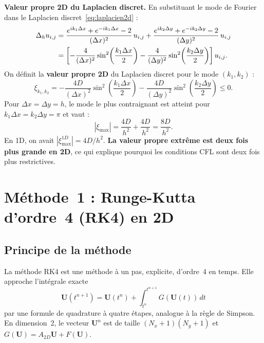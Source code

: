 \documentclass[11pt,a4paper]{report}
\begin{document}
\textbf{Valeur propre 2D du Laplacien discret.}
En substituant le mode de Fourier dans le Laplacien discret~\eqref{eq:laplacien2d} :
\begin{align}
  \Delta_h u_{i,j} &= \frac{e^{ik_1\Delta x}+e^{-ik_1\Delta x}-2}{(\Delta x)^2}\,u_{i,j}
                   + \frac{e^{ik_2\Delta y}+e^{-ik_2\Delta y}-2}{(\Delta y)^2}\,u_{i,j} \notag\\
  &= \left[-\frac{4}{(\Delta x)^2}\sin^2\!\left(\frac{k_1\Delta x}{2}\right)
           -\frac{4}{(\Delta y)^2}\sin^2\!\left(\frac{k_2\Delta y}{2}\right)\right]u_{i,j}.
\end{align}
On d\'efinit la \textbf{valeur propre 2D} du Laplacien discret pour le mode $(k_1,k_2)$ :
\begin{equation}\label{eq:eigenvalue2d}
  \boxed{\xi_{k_1,k_2} = -\frac{4D}{(\Delta x)^2}\sin^2\!\left(\frac{k_1\Delta x}{2}\right)
                         -\frac{4D}{(\Delta y)^2}\sin^2\!\left(\frac{k_2\Delta y}{2}\right) \le 0.}
\end{equation}
Pour $\Delta x=\Delta y=h$, le mode le plus contraignant est atteint pour
$k_1\Delta x=k_2\Delta y=\pi$ et vaut :
\begin{equation}
  |\xi_{\max}| = \frac{4D}{h^2}+\frac{4D}{h^2} = \frac{8D}{h^2}.
\end{equation}
En 1D, on avait $|\xi_{\max}^{1D}|=4D/h^2$.
\textbf{La valeur propre extr\^eme est deux fois plus grande en 2D},
ce qui explique pourquoi les conditions CFL sont deux fois plus restrictives.

\section{M\'ethode~1 : Runge-Kutta d'ordre~4 (RK4) en 2D}

\subsection*{Principe de la m\'ethode}

La m\'ethode RK4 est une m\'ethode \`a un pas, explicite, d'ordre~4 en temps.
Elle approche l'int\'egrale exacte
\begin{equation}
  \mathbf{U}(t^{n+1}) = \mathbf{U}(t^n) + \int_{t^n}^{t^{n+1}} G(\mathbf{U}(t))\,dt
\end{equation}
par une formule de quadrature \`a quatre \'etapes, analogue \`a la r\`egle de Simpson.
En dimension~2, le vecteur $\mathbf{U}^n$ est de taille $(N_x+1)(N_y+1)$ et
$G(\mathbf{U}) = A_{2D}\mathbf{U} + F(\mathbf{U})$.
\end{document}
